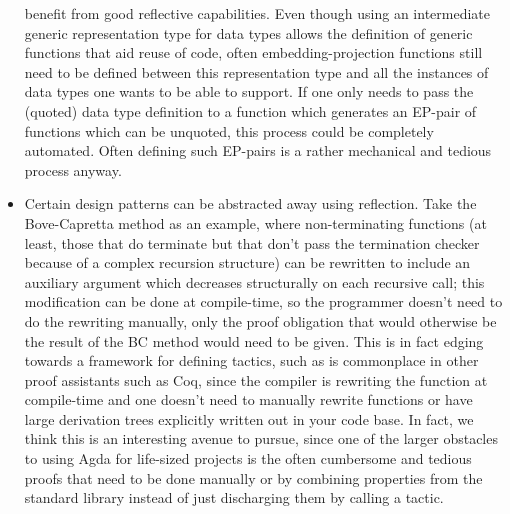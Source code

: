 \begin{itemize}
benefit from good reflective capabilities. Even though using an
intermediate generic representation type for data types allows the
definition of generic functions that aid reuse of code, often
embedding-projection functions still need to be defined between this
representation type and all the instances of data types one wants to be
able to support. If one only needs to pass the
(quoted) data type definition to a function which generates an EP-pair
of functions which can be unquoted, this process could be completely
automated. Often defining such EP-pairs is a rather mechanical and
tedious process anyway.
  \item Certain design patterns can be abstracted away using
reflection. Take the Bove-Capretta method as an example, where
non-terminating functions (at least, those that do terminate but that
don't pass the termination checker because of a complex recursion
structure) can be rewritten to include an auxiliary argument which
decreases structurally on each recursive call; this modification can be done at compile-time, so the programmer doesn't
need to do the rewriting manually, only the proof obligation that
would otherwise be
the result of the BC method would need to be given.  This is in fact
edging towards a framework for defining tactics, such as is
commonplace in other proof assistants such as Coq, since the
compiler is rewriting the function at compile-time and one doesn't
need to manually rewrite functions or have large derivation trees
explicitly written out in your code base.  In fact, we think this is
an interesting avenue to pursue, since one of the larger obstacles to
using Agda for life-sized projects is the often cumbersome and tedious
proofs that need to be done manually or by combining properties from
the standard library instead of just discharging them by calling a
tactic.
\end{itemize}



